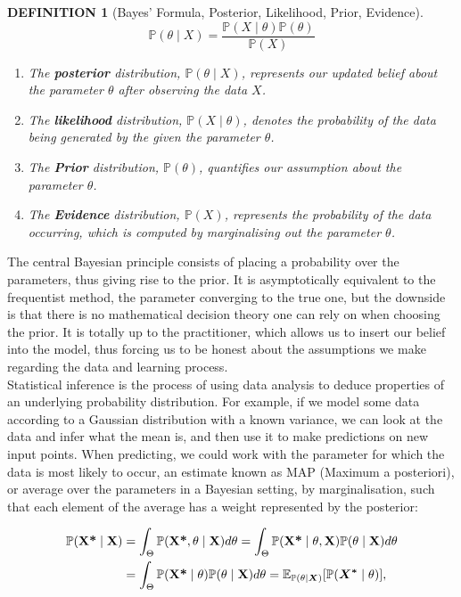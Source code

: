 \documentclass[12pt]{report}
\newtheorem{definition}[theorem]{DEFINITION}
\newcommand{\bs}{\boldsymbol}
\newcommand{\mb}[1]{\mathbb{#1}}
\newcommand{\E}{\mathbb{E}}
\renewcommand{\P}{\mathbb{P}}
\renewcommand{\bs}{\boldsymbol}
\begin{document}
\begin{definition}[Bayes' Formula, Posterior, Likelihood, Prior, Evidence]
\label{eq:bayesdef}
\begin{equation*}
    \mb{P}(\theta \mid X) = \frac{\mb{P}(X \mid \theta)\mb{P}(\theta)}{\mb{P}(X)}
\end{equation*}
\begin{enumerate}
    \item The \textbf{posterior} distribution, $\mathbb{P}(\theta \mid X)$, represents our updated belief about the parameter $\theta$ after observing the data $X$.
    \item The \textbf{likelihood} distribution, $\mathbb{P}(X \mid \theta)$, denotes the probability of the data being generated by the given the parameter $\theta$.
    \item The \textbf{Prior} distribution, $\mathbb{P}(\theta)$, quantifies our assumption about the parameter $\theta$.
    \item The \textbf{Evidence} distribution, $\mathbb{P}(X)$, represents the probability of the data occurring, which is computed by marginalising out the parameter $\theta$.
\end{enumerate}
\end{definition}

The central Bayesian principle consists of placing a probability over the parameters, thus giving rise to the prior. It is asymptotically equivalent to the frequentist method, the parameter converging to the true one, but the downside is that there is no mathematical decision theory one can rely on when choosing the prior. It is totally up to the practitioner, which allows us to insert our belief into the model, thus forcing us to be honest about the assumptions we make regarding the data and learning process. \\

Statistical inference is the process of using data analysis to deduce properties of an underlying probability distribution. For example, if we model some data according to a Gaussian distribution with a known variance, we can look at the data and infer what the mean is, and then use it to make predictions on new input points. When predicting, we could work with the parameter for which the data is most likely to occur, an estimate known as MAP (Maximum a posteriori), or average over the parameters in a Bayesian setting, by marginalisation, such that each element of the average has a weight represented by the posterior:

\begin{align}
    \mathbb{P}(\textbf{X*} \mid \textbf{X}) &= \int_{\Theta} \mathbb{P}(\textbf{X*}, \theta \mid \textbf{X}) d\theta = \int_{\Theta} \mathbb{P}(\textbf{X*} \mid \theta, \textbf{X}) \mathbb{P}(\theta \mid \textbf{X}) d\theta \\ 
    &= \int_{\Theta} \mathbb{P}(\textbf{X*} \mid \theta) \mathbb{P}(\theta \mid \textbf{X}) d\theta = \E_{\P(\theta \mid \bs{X})}[\P(\bs{X^*} \mid \theta)], \notag
\end{align}
\end{document}
